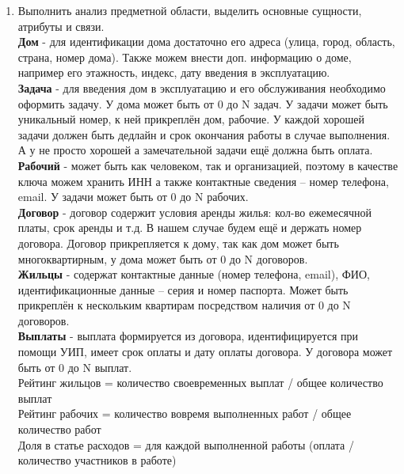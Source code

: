 \documentclass[a4paper,14pt]{extarticle}
\begin{document}
\begin{enumerate}[1.]
    \item Выполнить анализ предметной области, выделить основные сущности, атрибуты и связи.\\
          
    \textbf{Дом} - для идентификации дома достаточно его адреса 
    (улица, город, область, страна, номер дома). 
    Также можем внести доп. информацию о доме, 
    например его этажность, индекс, дату введения в эксплуатацию.\\
    \textbf{Задача} - для введения дом в эксплуатацию и его 
    обслуживания необходимо оформить задачу. У дома может быть 
    от 0 до N задач. У задачи может быть уникальный номер, к ней 
    прикреплён дом, рабочие. У каждой хорошей задачи должен быть 
    дедлайн и срок окончания работы в случае выполнения. 
    А у не просто хорошей а замечательной задачи ещё должна быть оплата.\\
    \textbf{Рабочий} - может быть как человеком, так и организацией, 
    поэтому в качестве ключа можем хранить ИНН а также контактные 
    сведения – номер телефона, email. У задачи может быть от 0 до N рабочих.\\
    \textbf{Договор} - договор содержит условия аренды жилья: 
    кол-во ежемесячной платы, срок аренды и т.д. 
    В нашем случае будем ещё и держать номер договора. 
    Договор прикрепляется к дому, так как дом может быть многоквартирным, 
    у дома может быть от 0 до N договоров.\\
    \textbf{Жильцы} - содержат контактные данные (номер телефона, email), 
    ФИО, идентификационные данные – серия и номер паспорта. Может быть 
    прикреплён к нескольким квартирам посредством наличия 
    от 0 до N договоров.\\
    \textbf{Выплаты} - выплата формируется из договора, идентифицируется при 
    помощи УИП, имеет срок оплаты и дату оплаты договора. У договора может быть
    от 0 до N выплат.\\
    Рейтинг жильцов = количество своевременных выплат / общее количество выплат\\
    Рейтинг рабочих = количество вовремя выполненных работ / общее количество работ\\
    Доля в статье расходов = для каждой выполненной работы (оплата / количество участников в работе)\\


\end{enumerate}
\end{document}
